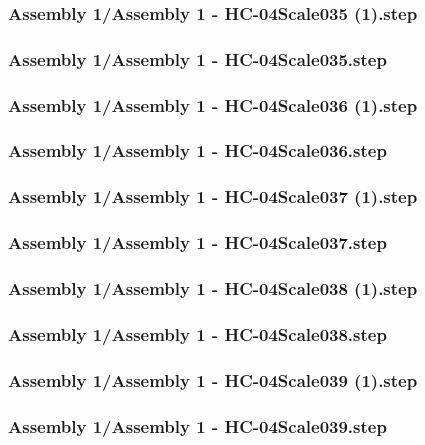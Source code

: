 \documentclass[a4paper,12pt]{article}
\begin{document}
\subsubsection{Assembly 1/Assembly 1 - HC-04Scale035 (1).step}

\subsubsection{Assembly 1/Assembly 1 - HC-04Scale035.step}

\subsubsection{Assembly 1/Assembly 1 - HC-04Scale036 (1).step}

\subsubsection{Assembly 1/Assembly 1 - HC-04Scale036.step}

\subsubsection{Assembly 1/Assembly 1 - HC-04Scale037 (1).step}

\subsubsection{Assembly 1/Assembly 1 - HC-04Scale037.step}

\subsubsection{Assembly 1/Assembly 1 - HC-04Scale038 (1).step}

\subsubsection{Assembly 1/Assembly 1 - HC-04Scale038.step}

\subsubsection{Assembly 1/Assembly 1 - HC-04Scale039 (1).step}

\subsubsection{Assembly 1/Assembly 1 - HC-04Scale039.step}

\end{document}
